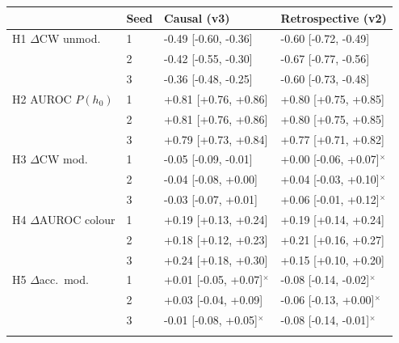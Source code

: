 \begin{tabular}{lll@{\hspace{4pt}}l}
\toprule
& Seed & Causal (v3) & Retrospective (v2) \\
\midrule
H1 $\Delta$CW unmod. & 1 & -0.49 [-0.60, -0.36] & -0.60 [-0.72, -0.49] \\
 & 2 & -0.42 [-0.55, -0.30] & -0.67 [-0.77, -0.56] \\
 & 3 & -0.36 [-0.48, -0.25] & -0.60 [-0.73, -0.48] \\
\addlinespace
H2 AUROC $P(h_0)$ & 1 & +0.81 [+0.76, +0.86] & +0.80 [+0.75, +0.85] \\
 & 2 & +0.81 [+0.76, +0.86] & +0.80 [+0.75, +0.85] \\
 & 3 & +0.79 [+0.73, +0.84] & +0.77 [+0.71, +0.82] \\
\addlinespace
H3 $\Delta$CW mod. & 1 & -0.05 [-0.09, -0.01] & +0.00 [-0.06, +0.07]$^\times$ \\
 & 2 & -0.04 [-0.08, +0.00] & +0.04 [-0.03, +0.10]$^\times$ \\
 & 3 & -0.03 [-0.07, +0.01] & +0.06 [-0.01, +0.12]$^\times$ \\
\addlinespace
H4 $\Delta$AUROC colour & 1 & +0.19 [+0.13, +0.24] & +0.19 [+0.14, +0.24] \\
 & 2 & +0.18 [+0.12, +0.23] & +0.21 [+0.16, +0.27] \\
 & 3 & +0.24 [+0.18, +0.30] & +0.15 [+0.10, +0.20] \\
\addlinespace
H5 $\Delta$acc.\ mod. & 1 & +0.01 [-0.05, +0.07]$^\times$ & -0.08 [-0.14, -0.02]$^\times$ \\
 & 2 & +0.03 [-0.04, +0.09] & -0.06 [-0.13, +0.00]$^\times$ \\
 & 3 & -0.01 [-0.08, +0.05]$^\times$ & -0.08 [-0.14, -0.01]$^\times$ \\
\addlinespace
\bottomrule
\end{tabular}
